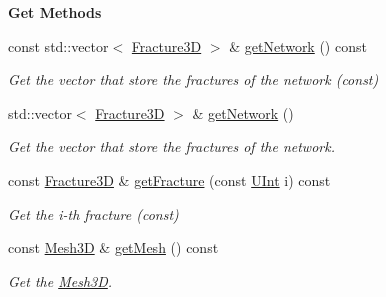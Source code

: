 \begin{Indent}{\bf Get Methods}\par
\begin{DoxyCompactItemize}
\item 
const std\+::vector$<$ \hyperlink{classFVCode3D_1_1Fracture3D}{Fracture3D} $>$ \& \hyperlink{classFVCode3D_1_1FractureNetwork3D_ad9a40fd0d922b50d29d60e8c4d65f496}{get\+Network} () const 
\begin{DoxyCompactList}\small\item\em Get the vector that store the fractures of the network (const) \end{DoxyCompactList}\item 
std\+::vector$<$ \hyperlink{classFVCode3D_1_1Fracture3D}{Fracture3D} $>$ \& \hyperlink{classFVCode3D_1_1FractureNetwork3D_a085a10923323606e5f90ca744491f546}{get\+Network} ()
\begin{DoxyCompactList}\small\item\em Get the vector that store the fractures of the network. \end{DoxyCompactList}\item 
const \hyperlink{classFVCode3D_1_1Fracture3D}{Fracture3D} \& \hyperlink{classFVCode3D_1_1FractureNetwork3D_aef2f83259eaeb30eb24c6fdb3f3c0753}{get\+Fracture} (const \hyperlink{namespaceFVCode3D_a4bf7e328c75d0fd504050d040ebe9eda}{U\+Int} i) const 
\begin{DoxyCompactList}\small\item\em Get the i-\/th fracture (const) \end{DoxyCompactList}\item 
const \hyperlink{classFVCode3D_1_1Mesh3D}{Mesh3D} \& \hyperlink{classFVCode3D_1_1FractureNetwork3D_a04a07134656457971212f2dbd453347e}{get\+Mesh} () const 
\begin{DoxyCompactList}\small\item\em Get the \hyperlink{classFVCode3D_1_1Mesh3D}{Mesh3D}. \end{DoxyCompactList}\end{DoxyCompactItemize}
\end{Indent}

